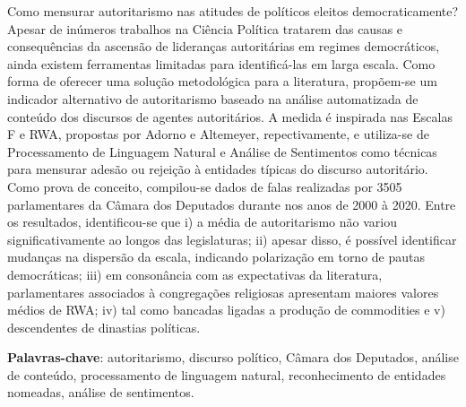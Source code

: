 \documentclass[
12pt,				%
openright,			%
twoside,			%
a4paper,			%
english,			%
french,				%
spanish,			%
brazil				%
]{abntex2}
\begin{document}


\setlength{\absparsep}{18pt} %
\begin{resumo}
	Como mensurar autoritarismo nas atitudes de políticos eleitos democraticamente? Apesar de inúmeros trabalhos na Ciência Política tratarem das causas e consequências da ascensão de lideranças autoritárias em regimes democráticos, ainda existem ferramentas limitadas para identificá-las em larga escala. Como forma de oferecer uma solução metodológica para a literatura, propõem-se um indicador alternativo de autoritarismo baseado na análise automatizada de conteúdo dos discursos de agentes autoritários. A medida é inspirada nas Escalas F e RWA, propostas por Adorno e Altemeyer, repectivamente, e utiliza-se de Processamento de Linguagem Natural e Análise de Sentimentos como técnicas para mensurar adesão ou rejeição à entidades típicas do discurso autoritário. Como prova de conceito, compilou-se dados de falas realizadas por 3505 parlamentares da Câmara dos Deputados durante nos anos de 2000 à 2020. Entre os resultados, identificou-se que i) a média de autoritarismo não variou significativamente ao longos das legislaturas; ii) apesar disso, é possível identificar mudanças na dispersão da escala, indicando polarização em torno de pautas democráticas; iii) em consonância com as expectativas da literatura, parlamentares associados à congregações religiosas apresentam maiores valores médios de RWA; iv) tal como bancadas ligadas a produção de commodities e v) descendentes de dinastias políticas.

	\textbf{Palavras-chave}: autoritarismo, discurso político, Câmara dos Deputados, análise de conteúdo, processamento de linguagem natural, reconhecimento de entidades nomeadas, análise de sentimentos.
\end{resumo}
\end{document}
